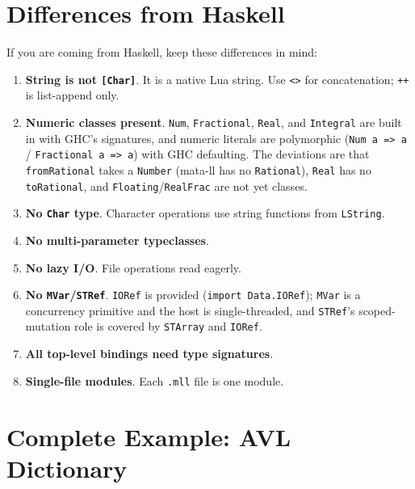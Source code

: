 \documentclass[11pt,a4paper]{article}
\begin{document}
\section{Differences from Haskell}

If you are coming from Haskell, keep these differences in mind:

\begin{enumerate}[nosep]
  \item \textbf{String is not \texttt{[Char]}}.  It is a native Lua string.
        Use \texttt{<>} for concatenation; \texttt{++} is list-append only.
  \item \textbf{Numeric classes present}.  \texttt{Num}, \texttt{Fractional},
        \texttt{Real}, and \texttt{Integral} are built in with GHC's signatures,
        and numeric literals are polymorphic (\texttt{Num a => a} /
        \texttt{Fractional a => a}) with GHC defaulting.  The deviations are
        that \texttt{fromRational} takes a \texttt{Number} (mata-ll has no
        \texttt{Rational}), \texttt{Real} has no \texttt{toRational}, and
        \texttt{Floating}/\texttt{RealFrac} are not yet classes.
  \item \textbf{No \texttt{Char} type}.  Character operations use string
        functions from \texttt{LString}.
  \item \textbf{No multi-parameter typeclasses}.
  \item \textbf{No lazy I/O}.  File operations read eagerly.
  \item \textbf{No \texttt{MVar}/\texttt{STRef}}.  \texttt{IORef} is
        provided (\texttt{import Data.IORef}); \texttt{MVar} is a
        concurrency primitive and the host is single-threaded, and
        \texttt{STRef}'s scoped-mutation role is covered by
        \texttt{STArray} and \texttt{IORef}.
  \item \textbf{All top-level bindings need type signatures}.
  \item \textbf{Single-file modules}.  Each \texttt{.mll} file is one module.
\end{enumerate}

\section{Complete Example: AVL Dictionary}
\end{document}
